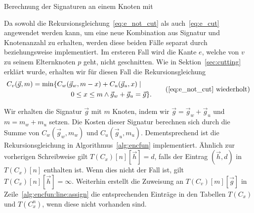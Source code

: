 \begin{algorithm}
    \caption{Berechnung der Signaturen an einem Knoten mit \canfun{}}\label{alg:canfun}
    \begin{algorithmic}[1]
                        \State {}
                        \State {}
                    \EndFor
                \EndFor
            \EndFor
        \EndFor
        \EndFunction
    \end{algorithmic}
\end{algorithm}

\newcommand{\encfun}{\textproc{edge\_not\_cut}}
\newcommand{\ecfun}{\textproc{edge\_cut}}

Da sowohl die Rekursionsgleichung~\eqref{eq:e_not_cut} als auch~\eqref{eq:e_cut} angewendet werden kann, um eine neue Kombination aus Signatur und Knotenanzahl zu erhalten, werden diese beiden Fälle separat durch \encfun{} beziehungsweise \ecfun{} implementiert.
Im ersteren Fall wird die Kante $e$, welche von $v$ zu seinem Elternknoten $p$ geht, nicht geschnitten.
Wie in Sektion~\ref{sec:cutting} erklärt wurde, erhalten wir für diesen Fall die Rekursionsgleichung
\begin{equation*}
    \begin{aligned}
        C_v(\vec{g}, m) = \min \{ & C_w(\vec{g}_w, m - x) + C_u(\vec{g}_u, x) \mid \\
        & \qquad 0 \leq x \leq m \land \vec{g}_w + \vec{g}_u = \vec{g} \}.
    \end{aligned}
    \tag{\ref{eq:e_not_cut} wiederholt}
\end{equation*}

Wir erhalten die Signatur $\vec{g}$ mit $m$ Knoten, indem wir $\vec{g} = \vec{g}_w + \vec{g}_u$ und $m = m_w + m_u$ setzen.
Die Kosten dieser Signatur berechnen sich durch die Summe von $C_w(\vec{g}_w, m_w)$ und $C_u(\vec{g}_u, m_u)$.
Dementsprechend ist die Rekursionsgleichung in Algorithmus~\ref{alg:encfun} implementiert.
Ähnlich zur vorherigen Schreibweise gilt $T(C_x)[n][\vec{h}] = d$, falls der Eintrag $(\vec{h}, d)$ in $T(C_x)[n]$ enthalten ist.
Wenn dies nicht der Fall ist, gilt $T(C_x)[n][\vec{h}] = \infty$.
Weiterhin erstellt die Zuweisung an $T(C_v)[m][\vec{g}]$ in Zeile~\ref{alg:encfun:line:assign} die entsprechenden Einträge in den Tabellen $T(C_x)$ und $T(C_x^n)$, wenn diese nicht vorhanden sind.

